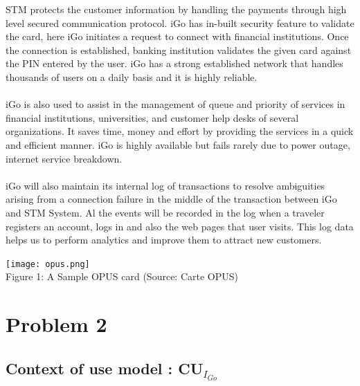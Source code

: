 \documentclass[a4paper, 11pt]{report}
\begin{document}
STM protects the customer information by handling the payments through high level secured communication protocol. iGo has in-built security feature to validate the card, here iGo initiates a request to connect with financial institutions. Once the connection is established, banking institution validates the given card against the PIN entered by the user. iGo has a strong established network that handles thousands of users on a daily basis and it is highly reliable.\\\\
iGo is also used to assist in the management of queue and priority of services in financial institutions, universities, and customer help desks of several organizations. It saves time, money and effort by providing the services in a quick and efficient manner. iGo is highly available but fails rarely due to power outage, internet service breakdown.\\\\
iGo will also maintain its internal log of transactions to resolve ambiguities arising from a connection failure in the middle of the transaction between iGo and STM System. Al the events will be recorded in the log when a traveler registers an account, logs in and also the web pages that user visits. This log data helps us to perform analytics and improve them to attract new customers.

\qquad\qquad\qquad\qquad \texttt{[image: opus.png]}\\
\tab\tab\qquad\qquad Figure 1: A Sample OPUS card (Source: Carte OPUS)

\chapter{Problem 2}
\section{Context of use model : CU$_{I_{Go}}$}
\end{document}
